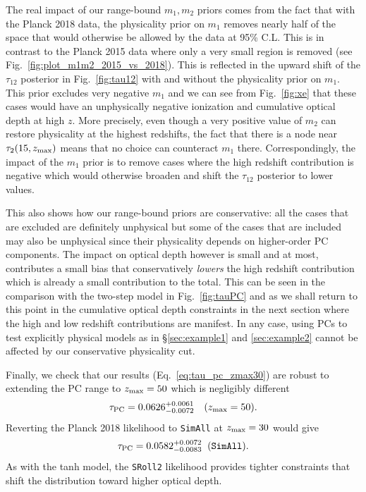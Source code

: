\documentclass[prd,twocolumn,amsmath,amssymb,floatfix,superscriptaddress,nofootinbib]{revtex4-1}
\newcommand{\zmax}{z_{\rm max}}
\newcommand{\beq}{\begin{equation}}
\newcommand{\eeq}{\end{equation}}
\begin{document}
{The real impact of our range-bound $m_1,m_2$ priors comes from the fact that with the Planck 2018 data, the physicality prior on $m_1$
removes nearly half of the space that would otherwise be allowed by the
data at 95\% C.L.  This is in contrast to the Planck 2015 data where only a very small region is removed (see Fig.~\ref{fig:plot_m1m2_2015_vs_2018}).  
This is reflected in the upward shift of the $\tau_{12}$ posterior in Fig.~\ref{fig:tau12} with and without the physicality prior on $m_1$.   This prior excludes very negative $m_1$ and we can see from Fig.~\ref{fig:xe} that these cases would have an unphysically negative ionization and cumulative optical depth at high $z$.  More precisely, even though a very positive value 
of $m_2$ can restore physicality at the highest redshifts, the fact that there is a node near $\tau_2(15,z_{\rm max})$ means that no choice can counteract $m_1$ there.  
Correspondingly, the impact of the $m_1$ prior is to remove
cases where the high redshift contribution is negative which would otherwise broaden and shift the $\tau_{12}$ posterior to lower values.

This also shows how our range-bound priors 
are conservative: all the cases that are excluded are definitely unphysical but some of the cases that are included
may also be unphysical since their physicality depends on higher-order PC components.  The impact on optical depth  however is small and at most, contributes a small bias that conservatively {\it lowers} the high redshift contribution which is already a small contribution to the total.  
This can be seen  in the comparison with the two-step model 
in Fig.~\ref{fig:tauPC} and as we shall return to this point in the cumulative optical depth constraints in the next section where the high and low redshift contributions are manifest.
In any case, using PCs to 
test explicitly physical models as in \S \ref{sec:example1} and
\ref{sec:example2} cannot be affected by our conservative physicality
cut.

Finally, we check that our results (Eq.~\ref{eq:tau_pc_zmax30}) are robust to
 extending the PC
range to
$z_{\rm max}=50$ which is negligibly different
%
\beq
\tau_{\rm PC} = 0.0626^{+0.0061}_{-0.0072}\quad (\zmax=50).
\eeq
%
Reverting the Planck 2018 likelihood to \texttt{SimAll} at $z_{\rm max}=30$ would give
\beq
\tau_{\rm PC} = 0.0582 ^{+0.0072}_{-0.0083}\;\; (\texttt{SimAll}).
\eeq
As with the tanh model, the \texttt{SRoll2} likelihood provides tighter constraints that shift the distribution toward higher optical depth.



}
\end{document}
